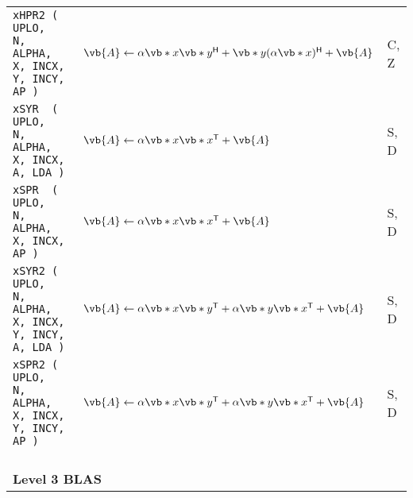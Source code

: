 \documentclass[10pt,a3paper, landscape]{article}
\newcommand{\T}{\mathsf{T}}
\renewcommand{\H}{\mathsf{H}}
\begin{document}
\begin{tabular}{lll}
		\verb|xHPR2 ( UPLO,                 N, ALPHA, X, INCX, Y, INCY, AP )                           | & $\vb{A} \gets \alpha \vb*{x}\vb*{y}^{\H} + \vb*{y}(\alpha \vb*{x})^{\H} + \vb{A}$                                                                                                                                                                            & C, Z               \\
		\verb|xSYR  ( UPLO,                 N, ALPHA, X, INCX,          A, LDA )                       | & $\vb{A} \gets \alpha \vb*{x}\vb*{x}^{\T} + \vb{A}$                                                                                                                                                                                                           & S, D               \\
		\verb|xSPR  ( UPLO,                 N, ALPHA, X, INCX,          AP )                           | & $\vb{A} \gets \alpha \vb*{x}\vb*{x}^{\T} + \vb{A}$                                                                                                                                                                                                           & S, D               \\
		\verb|xSYR2 ( UPLO,                 N, ALPHA, X, INCX, Y, INCY, A, LDA )                       | & $\vb{A} \gets \alpha \vb*{x}\vb*{y}^{\T} + \alpha \vb*{y}\vb*{x}^{\T} + \vb{A}$                                                                                                                                                                              & S, D               \\
		\verb|xSPR2 ( UPLO,                 N, ALPHA, X, INCX, Y, INCY, AP )                           | & $\vb{A} \gets \alpha \vb*{x}\vb*{y}^{\T} + \alpha \vb*{y}\vb*{x}^{\T} + \vb{A}$                                                                                                                                                                              & S, D               \\
		\verb|                                                                                         | &                                                                                                                                                                                                                                                              &                    \\
		\multicolumn{3}{l}{\Large{\textbf{Level 3 BLAS}}}                                                                                                                                                                                                                                                                                                                                     \\

\end{tabular}
\end{document}
